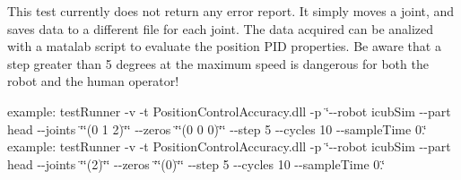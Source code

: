 This test currently does not return any error report. It simply moves a joint, and saves data to a different file for each joint. The data acquired can be analized with a matalab script to evaluate the position P\+ID properties. Be aware that a step greater than 5 degrees at the maximum speed is dangerous for both the robot and the human operator!

example\+: test\+Runner -\/v -\/t Position\+Control\+Accuracy.\+dll -\/p \char`\"{}-\/-\/robot icub\+Sim -\/-\/part head -\/-\/joints \char`\"{}\char`\"{}(0 1 2)\char`\"{}\char`\"{} -\/-\/zeros \char`\"{}\char`\"{}(0 0 0)\char`\"{}\char`\"{}  -\/-\/step 5  -\/-\/cycles 10 -\/-\/sample\+Time 0.\char`\"{} example\+: test\+Runner -\/v -\/t Position\+Control\+Accuracy.\+dll -\/p \char`\"{}-\/-\/robot icub\+Sim -\/-\/part head -\/-\/joints \char`\"{}\char`\"{}(2)\char`\"{}\char`\"{} -\/-\/zeros \char`\"{}\char`\"{}(0)\char`\"{}\char`\"{} -\/-\/step 5 -\/-\/cycles 10 -\/-\/sample\+Time 0.\char`\"{}

